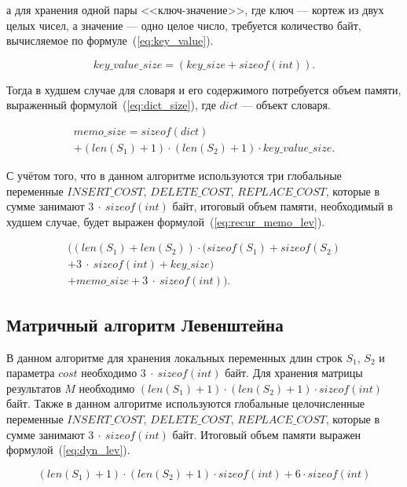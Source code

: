 а для хранения одной пары <<ключ-значение>>, где ключ --- кортеж из двух целых чисел, а значение --- одно целое число, требуется количество байт, вычисляемое по формуле~(\ref{eq:key_value}).

\begin{equation}
    \label{eq:key_value}
    key\_value\_size = (key\_size + sizeof(int)).
\end{equation}

Тогда в худшем случае для словаря и его содержимого потребуется объем памяти, выраженный формулой~(\ref{eq:dict_size}), где $dict$ --- объект словаря.

\begin{multline}
    \label{eq:dict_size}
    memo\_size = sizeof(dict) \\
    + (len(S_1) + 1) \cdot (len(S_2) + 1) \cdot key\_value\_size.
\end{multline}

С учётом того, что в данном алгоритме используются три глобальные переменные $INSERT\_COST$, $DELETE\_COST$, $REPLACE\_COST$, которые в сумме занимают $3~\cdot~sizeof(int)$ байт, итоговый объем памяти, необходимый в худшем случае, будет выражен формулой~(\ref{eq:recur_memo_lev}).

\begin{multline}
    \label{eq:recur_memo_lev}
    ((len(S_1) + len(S_2)) \cdot (sizeof(S_1) + sizeof(S_2) \\
    + 3~\cdot~sizeof(int) + key\_size) \\
    + memo\_size + 3~\cdot~sizeof(int)).
\end{multline}

\subsection{Матричный алгоритм Левенштейна}

В данном алгоритме для хранения локальных переменных длин строк $S_1$, $S_2$ и параметра $cost$ необходимо $3~\cdot~sizeof(int)$ байт. Для хранения матрицы результатов $M$ необходимо $(len(S_1) + 1) \cdot (len(S_2) + 1) \cdot sizeof(int)$ байт. Также в данном алгоритме используются глобальные целочисленные переменные $INSERT\_COST$, $DELETE\_COST$, $REPLACE\_COST$, которые в сумме занимают $3~\cdot~sizeof(int)$ байт. Итоговый объем памяти выражен формулой~(\ref{eq:dyn_lev}).

\begin{equation}
    \label{eq:dyn_lev}
    (len(S_1) + 1) \cdot (len(S_2) + 1) \cdot sizeof(int) + 6 \cdot sizeof(int)
\end{equation}

